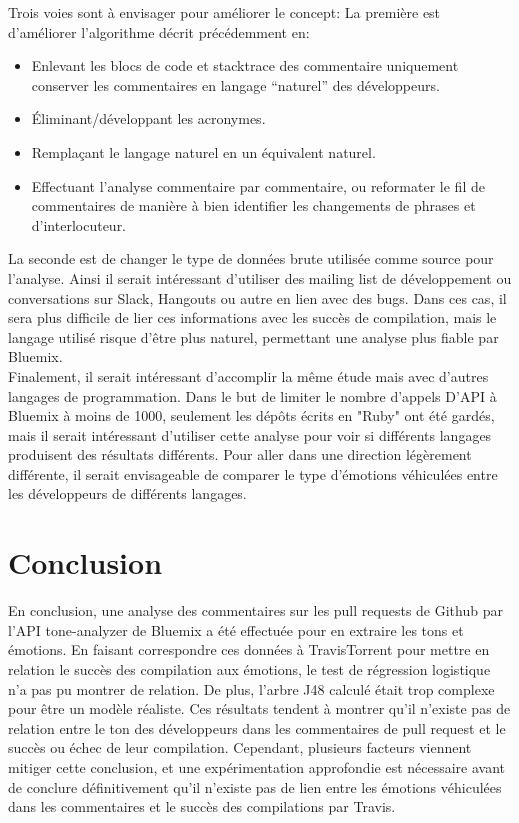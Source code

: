 \documentclass[10pt, conference]{IEEEtran}
\begin{document}
Trois voies sont à envisager pour améliorer le concept:
La première est d’améliorer l’algorithme décrit précédemment en:
\begin{itemize}
\item Enlevant les blocs de code et stacktrace des commentaire uniquement conserver les commentaires en langage “naturel” des développeurs.
\item Éliminant/développant les acronymes.
\item Remplaçant le langage naturel en un équivalent naturel.
\item Effectuant l’analyse commentaire par commentaire, ou reformater le fil de commentaires de manière à bien identifier les changements de phrases et d’interlocuteur.
\end{itemize}
La seconde est de changer le type de données brute utilisée comme source pour l’analyse. Ainsi il serait intéressant d’utiliser des mailing list de développement ou conversations sur Slack, Hangouts ou autre en lien avec des bugs. Dans ces cas, il sera plus difficile de lier ces informations avec les succès de compilation, mais le langage utilisé risque d’être plus naturel, permettant une analyse plus fiable par Bluemix. \\
Finalement, il serait intéressant d'accomplir la même étude mais avec d'autres langages de programmation. Dans le but de limiter le nombre d'appels D'API à Bluemix à moins de 1000, seulement les dépôts écrits en "Ruby" ont été gardés, mais il serait intéressant d'utiliser cette analyse pour voir si différents langages produisent des résultats différents. Pour aller dans une direction légèrement différente, il serait envisageable de comparer le type d'émotions véhiculées entre les développeurs de différents langages.

\section{Conclusion}
\label{sec:conclusion}

En conclusion, une analyse des commentaires sur les pull requests de Github par l'API tone-analyzer de Bluemix a été effectuée pour en extraire les tons et émotions. En faisant correspondre ces données à TravisTorrent pour mettre en relation le succès des compilation aux émotions, le test de régression logistique n'a pas pu montrer de relation. De plus, l'arbre J48 calculé était trop complexe pour être un modèle réaliste. Ces résultats tendent à montrer qu'il n'existe pas de relation entre le ton des développeurs dans les commentaires de pull request et le succès ou échec de leur compilation. Cependant, plusieurs facteurs viennent mitiger cette conclusion, et une expérimentation approfondie est nécessaire avant de conclure définitivement qu'il n'existe pas de lien entre les émotions véhiculées dans les commentaires et le succès des compilations par Travis. 
\end{document}

